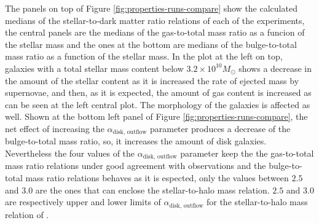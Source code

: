 \documentclass[usenatbib]{mn2e}
\begin{document}
The panels on top of
 Figure \ref{fig:properties-runs-compare} show the calculated medians of the stellar-to-dark matter ratio relations of each of the experiments, the central panels are the 
medians of the gas-to-total mass ratio as a funcion of the stellar mass and the ones at the bottom are medians of the bulge-to-total mass ratio as a function of the stellar mass. 
In the plot at the left on top, galaxies with a total stellar mass content below $3.2\times 10^{10}M_{\odot}$ shows a decrease in the amount of the stellar 
content as it is increased the rate of ejected mass by supernovae, and then, as it is expected, the amount of gas content is increased as can be seen 
at the left central plot. The morphology of the galaxies is affected as well. Shown at the bottom left panel of Figure \ref{fig:properties-runs-compare}, the
 net effect of increasing the $\alpha_{\text{disk, outflow}}$ parameter produces a decrease of the bulge-to-total mass ratio, so, it increases the amount 
of disk galaxies. Nevertheless the four values of the $\alpha_{\text{disk, outflow}}$ parameter keep the the gas-to-total mass ratio relations under good 
agreement with observations and the bulge-to-total mass ratio relations behaves as it is espected, only the values between $2.5$  and $3.0$ are the ones that
can enclose the stellar-to-halo mass relation. $2.5$  and $3.0$ are respectively  upper and lower limits of $\alpha_{\text{disk, outflow}}$ for the 
stellar-to-halo mass relation of \cite{2010ApJ...710..903M}.
\end{document}
